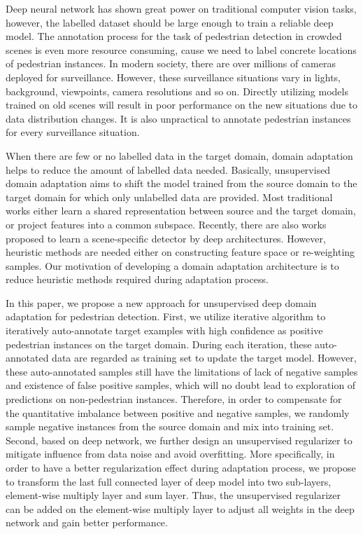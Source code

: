 \documentclass[runningheads]{llncs}
\begin{document}
Deep neural network has shown great power on traditional computer vision tasks, however, the labelled dataset should be large enough to train a reliable deep model. The annotation process for the task of pedestrian detection in crowded scenes is even more resource consuming, cause we need to label concrete locations of pedestrian instances. In modern society, there are over millions of cameras deployed for surveillance. However, these surveillance situations vary in lights, background, viewpoints, camera resolutions and so on. Directly utilizing models trained on old scenes will result in poor performance on the new situations due to data distribution changes. It is also unpractical to annotate pedestrian instances for every surveillance situation.

When there are few or no labelled data in the target domain, domain adaptation helps to reduce the amount of labelled data needed. Basically, unsupervised domain adaptation aims to shift the model trained from the source domain to the target domain for which only unlabelled data are provided. Most traditional works \cite{saenko2010adapting,kulis2011you,gopalan2011domain,huang2006correcting,gretton2009covariate} either learn a shared representation between source and the target domain, or project features into a common subspace. Recently, there are also works \cite{wang2014scene,zeng2014deep,hattori2015learning} proposed to learn a scene-specific detector by deep architectures. However, heuristic methods are needed either on constructing feature space or re-weighting samples. Our motivation of developing a domain adaptation architecture is to reduce heuristic methods required during adaptation process.

In this paper, we propose a new approach for unsupervised deep domain adaptation for pedestrian detection. First, we utilize iterative algorithm to iteratively auto-annotate target examples with high confidence as positive pedestrian instances on the target domain. During each iteration, these auto-annotated data are regarded as training set to update the target model. However, these auto-annotated samples still have the limitations of lack of negative samples and existence of false positive samples, which will no doubt lead to exploration of predictions on non-pedestrian instances. Therefore, in order to compensate for the quantitative imbalance between positive and negative samples, we randomly sample negative instances from the source domain and mix into training set. Second, based on deep network, we further design an unsupervised regularizer to mitigate influence from data noise and avoid overfitting. More specifically, in order to have a better regularization effect during adaptation process, we propose to transform the last full connected layer of deep model into two sub-layers, element-wise multiply layer and sum layer. Thus, the unsupervised regularizer can be added on the element-wise multiply layer to adjust all weights in the deep network and gain better performance.
\end{document}

